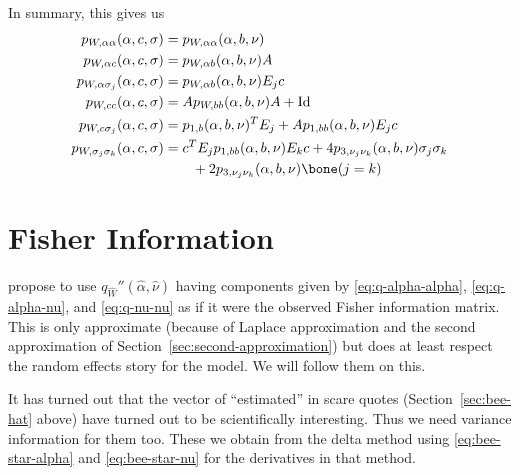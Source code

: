 In summary, this gives us
\begin{subequations}
\begin{align}
   p_{W, \alpha \alpha}(\alpha, c, \sigma)
   & =
   p_{W, \alpha \alpha}(\alpha, b, \nu)
   \\
   p_{W, \alpha c}(\alpha, c, \sigma)
   & =
   p_{W, \alpha b}(\alpha, b, \nu) A
   \\
   p_{W, \alpha \sigma_j}(\alpha, c, \sigma)
   & =
   p_{W, \alpha b}(\alpha, b, \nu) E_j c
   \\
   p_{W, c c}(\alpha, c, \sigma)
   & =
   A p_{W, b b}(\alpha, b, \nu) A + \text{Id}
   \\
   p_{W, c \sigma_j}(\alpha, c, \sigma)
   & =
   p_{1, b}(\alpha, b, \nu)^T E_j + A p_{1, b b}(\alpha, b, \nu) E_j c
   \\
   p_{W, \sigma_j \sigma_k}(\alpha, c, \sigma)
   & =
   c^T E_j p_{1, b b}(\alpha, b, \nu) E_k c
   +
   4 p_{3, \nu_j \nu_k}(\alpha, b, \nu) \sigma_j \sigma_k
   \nonumber
   \\
   & \qquad
   +
   2 p_{3, \nu_j \nu_k}(\alpha, b, \nu) \bone(j = k)
\end{align}
\end{subequations}

\section{Fisher Information}

\citet{reaster} propose to use $q_{\widehat{W}}''(\hat{\alpha}, \hat{\nu})$
having components given by \eqref{eq:q-alpha-alpha}, \eqref{eq:q-alpha-nu}, and
\eqref{eq:q-nu-nu} as if it were the observed Fisher information matrix.
This is only approximate (because of Laplace approximation and the second
approximation of Section~\ref{sec:second-approximation}) but does at least
respect the random effects story for the model.
We will follow them on this.

It has turned out that the vector of ``estimated'' in scare quotes
(Section~\ref{sec:bee-hat} above) have turned out to be scientifically
interesting.  Thus we need variance information for them too.
These we obtain from the delta method using \eqref{eq:bee-star-alpha} and
\eqref{eq:bee-star-nu} for the derivatives in that method.
